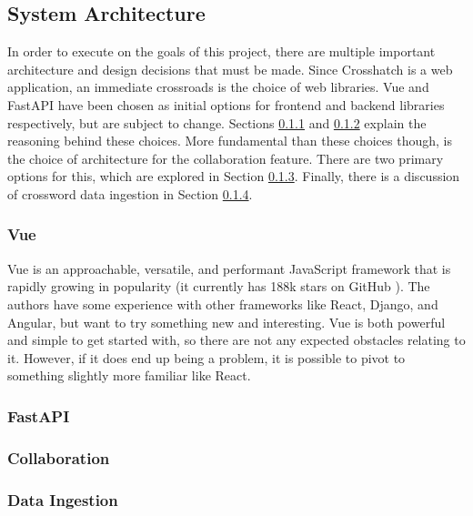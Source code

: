 \documentclass{article}
\begin{document}
\subsection{System Architecture}

In order to execute on the goals of this project, there are multiple important architecture and design decisions that must be made.
Since Crosshatch
is a web application, an immediate crossroads is the choice of web libraries. Vue and FastAPI have been chosen
as initial options for frontend and backend libraries respectively, but are subject to change. Sections \ref{vue}
and \ref{fastapi} explain the reasoning behind these choices.
More fundamental than these choices though, is the choice of architecture for the collaboration feature. There are two primary
options for this, which are explored in Section \ref{collabarch}. Finally, there is a discussion of crossword data ingestion in
Section \ref{ingestarch}.

\subsubsection{Vue}
\label{vue}
Vue \cite{vue} is an approachable, versatile, and performant JavaScript framework that is rapidly growing
in popularity (it currently has 188k stars on GitHub \cite{vuegithub}). The authors have some experience
with other frameworks like React, Django, and Angular, but want to try something new and interesting.
Vue is both powerful and simple to get started with, so there are not any expected obstacles
relating to it. However, if it does end up being a problem, it is possible to pivot to something
slightly more familiar like React.

\subsubsection{FastAPI}
\label{fastapi}

\subsubsection{Collaboration}
\label{collabarch}

\subsubsection{Data Ingestion}
\label{ingestarch}
\end{document}
